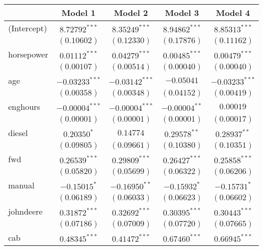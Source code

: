 
\begin{table}
\begin{center}
\begin{tabular}{l c c c c}
\hline
 & Model 1 & Model 2 & Model 3 & Model 4 \\
\hline
(Intercept)         & $8.72792^{***}$  & $8.35249^{***}$  & $8.94862^{***}$ & $8.85313^{***}$  \\
                    & $(0.10602)$      & $(0.12330)$      & $(0.17876)$     & $(0.11162)$      \\
horsepower          & $0.01112^{***}$  & $0.04279^{***}$  & $0.00485^{***}$ & $0.00479^{***}$  \\
                    & $(0.00107)$      & $(0.00514)$      & $(0.00040)$     & $(0.00040)$      \\
age                 & $-0.03233^{***}$ & $-0.03142^{***}$ & $-0.05041$      & $-0.03233^{***}$ \\
                    & $(0.00358)$      & $(0.00348)$      & $(0.04152)$     & $(0.00419)$      \\
enghours            & $-0.00004^{***}$ & $-0.00004^{***}$ & $-0.00004^{**}$ & $0.00019$        \\
                    & $(0.00001)$      & $(0.00001)$      & $(0.00001)$     & $(0.00017)$      \\
diesel              & $0.20350^{*}$    & $0.14774$        & $0.29578^{**}$  & $0.28937^{**}$   \\
                    & $(0.09805)$      & $(0.09661)$      & $(0.10380)$     & $(0.10351)$      \\
fwd                 & $0.26539^{***}$  & $0.29809^{***}$  & $0.26427^{***}$ & $0.25858^{***}$  \\
                    & $(0.05820)$      & $(0.05699)$      & $(0.06322)$     & $(0.06206)$      \\
manual              & $-0.15015^{*}$   & $-0.16950^{**}$  & $-0.15932^{*}$  & $-0.15731^{*}$   \\
                    & $(0.06189)$      & $(0.06033)$      & $(0.06623)$     & $(0.06602)$      \\
johndeere           & $0.31872^{***}$  & $0.32692^{***}$  & $0.30395^{***}$ & $0.30443^{***}$  \\
                    & $(0.07186)$      & $(0.07009)$      & $(0.07720)$     & $(0.07665)$      \\
cab                 & $0.48345^{***}$  & $0.41472^{***}$  & $0.67460^{***}$ & $0.66945^{***}$  \\

\end{tabular}
\end{center}
\end{table}
